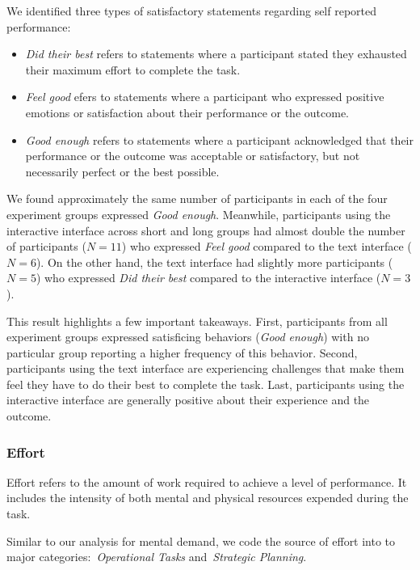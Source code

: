 We identified three types of satisfactory statements regarding self reported performance:
\begin{itemize}
    \item \textit{Did their best} refers to statements where a participant stated they exhausted their maximum effort to complete the task.
    \item \textit{Feel good} efers to statements where a participant who expressed positive emotions or satisfaction about their performance or the outcome.
    \item \textit{Good enough} refers to statements where a participant acknowledged that their performance or the outcome was acceptable or satisfactory, but not necessarily perfect or the best possible.
\end{itemize}

We found approximately the same number of participants in each of the four experiment groups expressed \textit{Good enough}. Meanwhile, participants using the interactive interface across short and long groups had almost double the number of participants ($N=11$) who expressed \textit{Feel good} compared to the text interface ($N=6$). On the other hand, the text interface had slightly more participants ($N=5$) who expressed \textit{Did their best} compared to the interactive interface ($N=3$).

This result highlights a few important takeaways. First, participants from all experiment groups expressed satisficing behaviors (\textit{Good enough}) with no particular group reporting a higher frequency of this behavior. Second, participants using the text interface are experiencing challenges that make them feel they have to do their best to complete the task. Last, participants using the interactive interface are generally positive about their experience and the outcome.




\subsubsection{Effort}
Effort refers to the amount of work required to achieve a level of performance. It includes the intensity of both mental and physical resources expended during the task.

Similar to our analysis for mental demand, we code the source of effort into to major categories:~\textit{Operational Tasks} and~\textit{Strategic Planning}.

